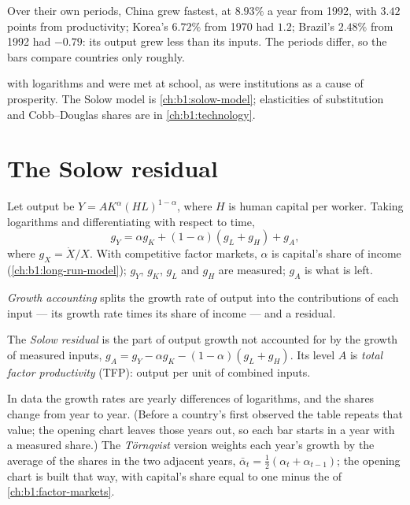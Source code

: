 Over their own periods, China grew fastest, at $8.93\%$ a year from 1992,
with $3.42$ points from productivity; Korea's $6.72\%$ from 1970 had $1.2$;
Brazil's $2.48\%$ from 1992 had $-0.79$: its output grew less than its
inputs. %
The periods differ, so the bars compare countries only roughly.

\begin{recall}
 with logarithms and  were met
at school, as were institutions as a cause of prosperity. The Solow model
is \cref{ch:b1:solow-model}; elasticities of substitution and Cobb--Douglas
shares are in \cref{ch:b1:technology}.
\end{recall}

\section{The Solow residual}\label{sec:b1:growth-accounting:residual}

Let output be $Y = AK^{\alpha}(HL)^{1 - \alpha}$, where $H$ is human capital per worker. Taking
logarithms and differentiating with respect to time,
\[
g_Y = \alpha g_K + (1 - \alpha)(g_L + g_H) + g_A,
\]
where $g_X = \dot X/X$. With competitive factor markets, $\alpha$ is capital's share of
income (\cref{ch:b1:long-run-model}); $g_Y$, $g_K$, $g_L$ and $g_H$ are measured; $g_A$ is what
is left.

\begin{definition}\label{def:b1:growth-accounting:growth-accounting}
\emph{Growth accounting} splits the growth rate of output into the
contributions of each input --- its growth rate times its share of
income --- and a residual.
\end{definition}

\begin{definition}\label{def:b1:growth-accounting:tfp}
The \emph{Solow residual} is the part of output growth not accounted for by
the growth of measured inputs, $g_A = g_Y - \alpha g_K - (1 - \alpha)(g_L + g_H)$. Its level $A$ is
\emph{total factor productivity} (TFP): output per unit of combined inputs.
\end{definition}

In data the growth rates are yearly differences of logarithms, and the
shares change from year to year. (Before a country's first observed  the table repeats that value; the opening chart leaves those years
out, so each bar starts in a year with a measured share.) The \emph{Törnqvist} version weights each
year's growth by the average of the shares in the two adjacent years,
$\bar\alpha_t = \tfrac12(\alpha_t + \alpha_{t-1})$; the opening chart is built that way, with capital's
share equal to one minus the  of \cref{ch:b1:factor-markets}.

